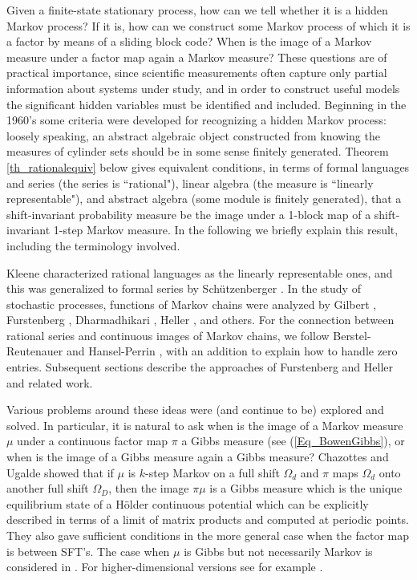 \documentclass{kepart2010}
\theoremstyle{plain}
\theoremstyle{definition}
\theoremstyle{remark}
\theoremstyle{definition}
\numberwithin{equation}{section}
\begin{document}
Given a finite-state stationary process, how can we tell whether it
is a hidden Markov process? If it is, how can we construct some
Markov process of which it is a factor by means of a sliding block
code? When is the image of a Markov measure under a factor map again
a Markov measure? These questions are of practical importance, since
scientific measurements often capture only partial information about
systems under study, and in order to construct useful models the
significant hidden variables must be identified and included.
Beginning in the 1960's some criteria were developed for recognizing
a hidden Markov process: loosely speaking, an abstract algebraic
object constructed from knowing the measures of cylinder sets should
be in some sense finitely generated. Theorem \ref{th_rationalequiv}
below gives equivalent conditions, in terms of formal languages and
series (the series is ``rational"), linear algebra (the measure is
``linearly representable"), and abstract algebra (some module is
finitely generated), that a shift-invariant probability measure be
the image under a 1-block map of a shift-invariant 1-step Markov
measure. In the following we briefly explain this result, including
the terminology involved.

Kleene \cite{Kleene1956} characterized rational languages as the
linearly representable ones, and this was generalized to formal
series by Sch\"{u}tzenberger \cite{Schutzenberger1961}. In the study
of stochastic processes, functions of Markov chains were analyzed by
Gilbert \cite{Gilbert1959}, Furstenberg \cite{Furstenberg1960},
Dharmadhikari
\cite{Dharma1963,Dharma1963-2,Dharma1964,Dharma1965,Dharma1968,
DharmaNadkarni1970},
Heller \cite{Heller1965, Heller1967}, and others. For the connection
between rational series and continuous images of Markov chains, we
follow Berstel-Reutenauer \cite{BerstelReutenauer1988} and
Hansel-Perrin \cite{HanselPerrin1989}, with an addition to explain
how to handle zero entries. Subsequent sections describe the
approaches of Furstenberg and Heller and related work.

 Various problems around these ideas were (and
continue to be) explored and solved. In particular, it is natural to
ask when is the image of a Markov measure $\mu$ under a continuous
factor map $\pi$ a Gibbs measure (see (\ref{Eq_BowenGibbs}), or when
 is the image of a Gibbs measure again a Gibbs measure?
 Chazottes and Ugalde \cite{ChazottesUgalde2003} showed that
 if $\mu$ is $k$-step Markov on a full shift $\Omega_d$ and
  $\pi$ maps $\Omega_d$ onto another full shift $\Omega_D$,
  then the image $\pi\mu$ is a
Gibbs measure which is the unique equilibrium state of a H\"older
continuous potential which can be explicitly described in terms of a
limit of matrix products and computed at periodic points. They also
gave sufficient conditions in the more general case when the factor
map is between SFT's. The case when $\mu$ is Gibbs but not
necessarily Markov is considered in \cite{ChazottesUgalde2009}. For
higher-dimensional versions see for example \cite{KunschGeman1995,
MaesVandevelde1995, Haggstrom2003}.
\end{document}
